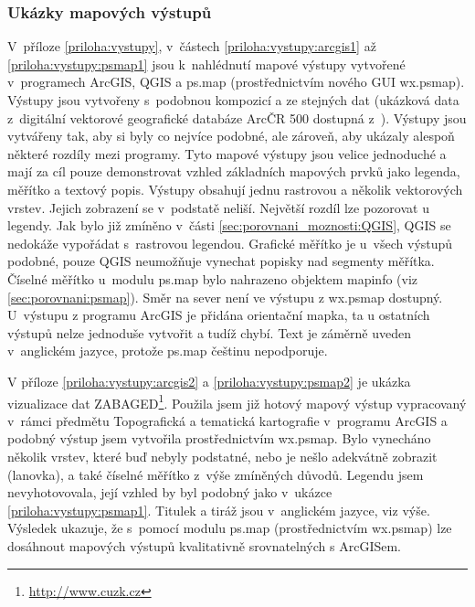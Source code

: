 \documentclass[a4paper,12pt,draft]{article}
\begin{document}
\subsubsection{Ukázky mapových výstupů}
V~příloze \ref{priloha:vystupy}, v~částech \ref{priloha:vystupy:arcgis1} až
\ref{priloha:vystupy:psmap1} jsou k~nahlédnutí mapové výstupy vytvořené
 v~programech ArcGIS, QGIS a ps.map (prostřednictvím nového GUI
wx.psmap). 
Výstupy jsou vytvořeny s~podobnou kompozicí a ze stejných dat (ukázková data
z~digitální vektorové geografické databáze ArcČR 500 dostupná
z~\cite{ArcCR500}). Výstupy jsou vytvářeny tak, aby si byly co nejvíce podobné,
ale zároveň, aby ukázaly alespoň některé  rozdíly mezi programy.
Tyto mapové výstupy jsou velice jednoduché a mají za cíl pouze demonstrovat
vzhled základních mapových prvků jako legenda, měřítko a textový popis. Výstupy
obsahují jednu rastrovou a několik vektorových vrstev. Jejich zobrazení se
v~podstatě neliší. Největší rozdíl lze pozorovat u legendy. Jak bylo již zmíněno
v~části \ref{sec:porovnani_moznosti:QGIS}, QGIS se nedokáže vypořádat
s~rastrovou legendou. Grafické měřítko je u~všech výstupů podobné, pouze QGIS
neumožňuje vynechat popisky nad segmenty měřítka. Číselné měřítko u~modulu
ps.map bylo nahrazeno objektem mapinfo (viz \ref{sec:porovnani:psmap}). Směr na
sever není ve výstupu z wx.psmap dostupný. U~výstupu z programu ArcGIS je
přidána orientační mapka, ta u ostatních výstupů nelze jednoduše
vytvořit a tudíž chybí. Text je záměrně uveden v~anglickém jazyce, protože
ps.map češtinu nepodporuje.

V příloze \ref{priloha:vystupy:arcgis2} a \ref{priloha:vystupy:psmap2} je
ukázka vizualizace dat ZABAGED\footnote{\url{http://www.cuzk.cz}}. Použila jsem
již hotový mapový výstup vypracovaný v~rámci předmětu Topografická a tematická
kartografie \cite{TTKH} v~programu ArcGIS a podobný výstup jsem vytvořila
prostřednictvím wx.psmap. Bylo vynecháno několik vrstev, které buď nebyly
podstatné, nebo je nešlo adekvátně zobrazit (lanovka), a také číselné měřítko
z~výše zmíněných důvodů. Legendu jsem nevyhotovovala, její vzhled by byl
podobný jako v~ukázce \ref{priloha:vystupy:psmap1}. Titulek a tiráž jsou
v~anglickém jazyce, viz výše. Výsledek ukazuje, že s~pomocí modulu ps.map
(prostřednictvím wx.psmap) lze dosáhnout mapových výstupů kvalitativně
srovnatelných s ArcGISem.


\fi
\end{document}
